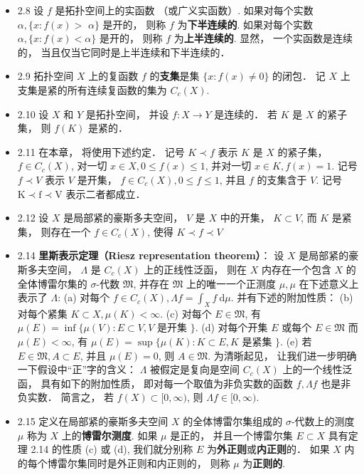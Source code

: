 \begin{itemize}
\item 2.8 设 $f$ 是拓扑空间上的实函数 （或广义实函数）. 如果对每个实数 $\alpha,\{x: f(x)>$ $\alpha\}$ 是开的， 则称 $f$ 为\textbf{下半连续的}. 如果对每个实数 $\alpha,\{x: f(x)<\alpha\}$ 是开的， 则称 $f$ 为\textbf{上半连续的}. 显然， 一个实函数是连续的， 当且仅当它同时是上半连续和下半连续的．

\item 2.9 拓扑空间 $X$ 上的复函数 $f$ 的\textbf{支集}是集 $\{x: f(x) \neq 0\}$ 的闭包． 记 $X$ 上支集是紧的所有连续复函数的集为 $C_{c}(X)$.

\item 2.10 设 $X$ 和 $Y$ 是拓扑空间， 并设 $f: X \rightarrow Y$ 是连续的． 若 $K$ 是 $X$ 的紧子集， 则 $f(K)$ 是紧的．

\item 2.11 在本章， 将使用下述约定． 记号 $K \prec f$ 表示 $K$ 是 $X$ 的紧子集， $f \in C_{c}(X)$, 对一切 $x \in X, 0 \leqslant f(x) \leqslant 1$, 并对一切 $x \in K, f(x)=1$. 记号 $f \prec V$ 表示 $V$ 是开集， $f \in C_{c}(X), 0 \leqslant f \leqslant 1$, 并且 $f$ 的支集含于 $V$. 记号 $\mathrm{K}\prec\mathrm{f}\prec\mathrm{V}$ 表示二者都成立．

\item 2.12 设 $X$ 是局部紧的豪斯多夫空间， $V$ 是 $X$ 中的开集， $K \subset V$, 而 $K$ 是紧集， 则存在一个 $f \in C_{c}(X)$, 使得 $K \prec f \prec V$

\item 2.14 \textbf{里斯表示定理（Riesz representation theorem）}： 设 $X$ 是局部紧的豪斯多夫空间， $\Lambda$ 是 $C_{c}(X)$ 上的正线性泛函， 则在 $X$ 内存在一个包含 $X$ 的全体博雷尔集的 $\sigma$-代数 $\mathfrak{M}$, 并存在 $\mathfrak{M}$ 上的唯一一个正测度 $\mu, \mu$ 在下述意义上表示了 $\Lambda$: 
(a) 对每个 $f \in C_{c}(X), \Lambda f=\int_{X} f \mathrm{~d} \mu$.
并有下述的附加性质：
(b) 对每个紧集 $K \subset X, \mu(K)<\infty$.
(c) 对每个 $E \in \mathfrak{M}$, 有 $\mu(E)=\inf \{\mu(V): E \subset V, V$ 是开集 $\} .$
(d) 对每个开集 $E$ 或每个 $E \in \mathfrak{M}$ 而 $\mu(E)<\infty$, 有 $\mu(E)=\sup \{\mu(K): K \subset E, K$ 是紧集 $\} .$
(e) 若 $E \in \mathfrak{M}, A \subset E$, 并且 $\mu(E)=0$, 则 $A \in \mathfrak{M}$.
为清晣起见， 让我们进一步明确一下假设中“正”字的含义： $\Lambda$ 被假定是复向是空间 $C_{c}(X)$ 上的一个线性泛函， 具有如下的附加性质， 即对每一个取值为非负实数的函数 $f, \Lambda f$ 也是非负实数． 简言之， 若 $f(X) \subset[0, \infty)$, 则 $\Lambda f \in[0, \infty)$.

\item 2.15 定义在局部紧的豪斯多夫空间 $X$ 的全体博雷尔集组成的 $\sigma$-代数上的测度 $\mu$ 称为 $X$ 上的\textbf{博雷尔测度}. 如果 $\mu$ 是正的， 并且一个博雷尔集 $E \subset X$ 具有定理 2.14 的性质 (c) 或 (d), 我们就分别称 $E$ 为\textbf{外正则}或\textbf{内正则}的． 如果 $X$ 内的每个博雷尔集同时是外正则和内正则的， 则称 $\mu$ 为\textbf{正则的}.


\end{itemize}

